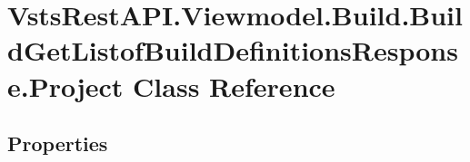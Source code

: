\hypertarget{class_vsts_rest_a_p_i_1_1_viewmodel_1_1_build_1_1_build_get_listof_build_definitions_response_1_1_project}{}\section{Vsts\+Rest\+A\+P\+I.\+Viewmodel.\+Build.\+Build\+Get\+Listof\+Build\+Definitions\+Response.\+Project Class Reference}
\label{class_vsts_rest_a_p_i_1_1_viewmodel_1_1_build_1_1_build_get_listof_build_definitions_response_1_1_project}
\subsection*{Properties}
